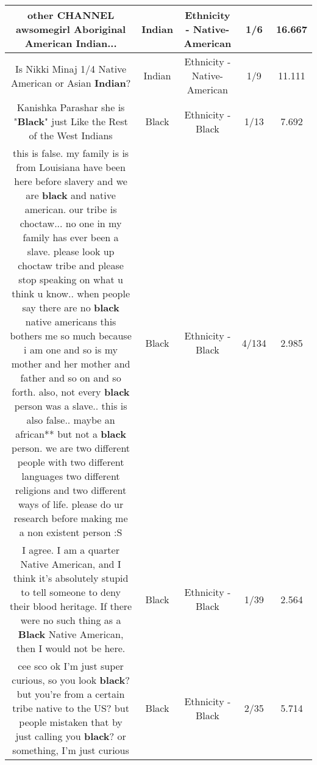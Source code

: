 \documentclass[11pt]{article}
\newlength\mylength
\begin{document}
\begin{center}
\begin{longtable}{|C{.65\mylength}|C{.30\mylength}|C{.12\mylength}|C{.12\mylength}|C{.12\mylength}|}
  \small other CHANNEL awsomegirl Aboriginal American \textbf{Indian}...\normalsize   & Indian & Ethnicity - Native-American & 1/6 & 16.667 \\  \hline
  \small Is Nikki Minaj 1/4 Native American or Asian \textbf{Indian}?\normalsize   & Indian & Ethnicity - Native-American & 1/9 & 11.111 \\  \hline
  \small Kanishka Parashar she is "\textbf{Black}" just Like the Rest of the West Indians\normalsize   & Black & Ethnicity - Black & 1/13 & 7.692 \\  \hline
  \small this is false. my family is is from Louisiana have been here before slavery and we are \textbf{black} and native american. our tribe is choctaw... no one in my family has ever been a slave. please look up choctaw tribe and please stop speaking on what u think u know.. when people say there are no \textbf{black} native americans this bothers me so much because i am one and so is my mother and her mother and father and so on and so forth. also, not every \textbf{black} person was a slave.. this is also false.. maybe an african** but not a \textbf{black} person. we are two different people with two different languages two different religions and two different ways of life. please do ur research before making me a non existent person :S\normalsize   & Black & Ethnicity - Black & 4/134 & 2.985 \\  \hline
  \small I agree. I am a quarter Native American, and I think it's absolutely stupid to tell someone to deny their blood heritage. If there were no such thing as a \textbf{Black} Native American, then I would not be here.\normalsize   & Black & Ethnicity - Black & 1/39 & 2.564 \\  \hline
  \small cee sco ok I'm just super curious, so you look \textbf{black}? but you're from a certain tribe native to the US? but people mistaken that by just calling you \textbf{black}? or something, I'm just curious\normalsize   & Black & Ethnicity - Black & 2/35 & 5.714 \\  \hline

\end{longtable}
\end{center}
\end{document}
